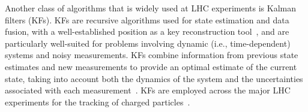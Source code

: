 Another class of algorithms that is widely used at LHC experiments is Kalman filters (KFs). KFs are recursive algorithms used for state estimation and data fusion, with a well-established position as a key reconstruction tool~\cite{kalman-track}, and are particularly well-suited for problems involving dynamic (i.e.,  time-dependent) systems and noisy measurements. KFs combine information from previous state estimates and new measurements to provide an optimal estimate of the current state, taking into account both the dynamics of the system and the uncertainties associated with each measurement~\cite{FRUHWIRTH1987444}. KFs are employed across the major LHC experiments for the tracking of charged particles~\cite{Belikov:2003yr,ATLAS:tracking,CMS:tracking,LHCb_Allen_GPU}.